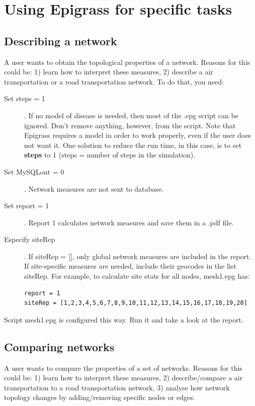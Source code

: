 \section{Using Epigrass for specific tasks}

\subsection{Describing a network}
A user wants to obtain the topological properties of a network. Reasons for this could be: 1) learn how to interpret these measures, 2) describe a air transportation or a road transportation network. To do that, you need:

\begin{description}
\item[Set steps = 1]. If no model of disease is needed, then most of the .epg script can be ignored. Don't remove anything, however, from the script.  Note that Epigrass requires a model in order to work properly, even if the user does not want it. One solution to reduce the run time, in this case, is to set \textbf{steps} to 1 (steps = number of steps in the simulation).
\item[Set MySQLout = 0]. Network measures are not sent to database.
\item[Set report = 1]. Report 1 calculates network measures and save them in a .pdf file.
\item[Especify siteRep]. If siteRep = [], only global network measures are included in the report. If site-specific measures are needed, include their geocodes in the list siteRep. For example, to calculate site stats for all nodes, mesh1.epg has:
\begin{verbatim}
report = 1
siteRep = [1,2,3,4,5,6,7,8,9,10,11,12,13,14,15,16,17,18,19,20]
\end{verbatim}
\end{description}

Script mesh1.epg is configured this way. Run it and take a look at the report. 


\subsection{Comparing networks}
A user wants to compare the properties of a set of networks. Reasons for this could be: 1) learn how to interpret these measures, 2) describe/compare a air transportation to a road transportation network, 3) analyse how network topology changes by adding/removing specific nodes or edges.

